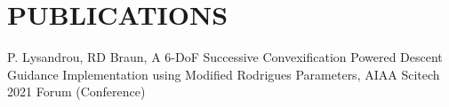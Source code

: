 \documentclass[]{deedy-resume-openfont}
\begin{document}
\begin{minipage}[t]{0.71\textwidth}

\section{\Large{PUBLICATIONS}}
\small{P. Lysandrou, RD Braun, A 6-DoF Successive Convexification Powered Descent Guidance Implementation using Modified Rodrigues Parameters, AIAA Scitech 2021 Forum (Conference)} \\

\end{minipage} 
\end{document}
